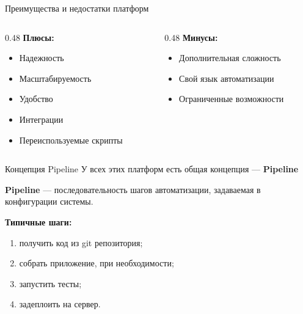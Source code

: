 \documentclass[aspectratio=169]{beamer}
\begin{document}
    \begin{frame}{Преимущества и недостатки платформ}
        \begin{columns}[t]
            \begin{column}[t]{0.48\textwidth}
                \textbf{Плюсы:}
                \begin{itemize}
                    \item Надежность
                    \item Масштабируемость
                    \item Удобство
                    \item Интеграции
                    \item Переиспользуемые скрипты
                \end{itemize}
            \end{column}
            
            \begin{column}[t]{0.48\textwidth}
                \textbf{Минусы:}
                \begin{itemize}
                    \item Дополнительная сложность
                    \item Свой язык автоматизации
                    \item Ограниченные возможности
                \end{itemize}
            \end{column}
        \end{columns}
    \end{frame}

    \begin{frame}{Концепция Pipeline}
        У всех этих платформ есть общая концепция — \textbf{Pipeline}
        
        \vspace{0.2cm}
        
        \textbf{Pipeline} — последовательность шагов автоматизации, задаваемая в конфигурации системы.

        \vspace{0.2cm}
        
        \textbf{Типичные шаги:}
        \begin{enumerate}
            \item получить код из git репозитория;
            \item собрать приложение, при необходимости;
            \item запустить тесты;
            \item задеплоить на сервер.
        \end{enumerate}
    \end{frame}
\end{document}
